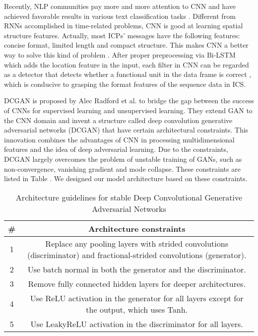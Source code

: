 Recently, NLP communities pay more and more attention to CNN and have achieved favorable results in various text classification tasks \cite{kim2014convolutional,zhang2015character}. Different from RNNs accomplished in time-related problems, CNN is good at learning spatial structure features. Actually, most ICPs’ messages have the following features: concise format, limited length and compact structure. This makes CNN a better way to solve this kind of problem \cite{kim2014convolutional}. After proper preprocessing via Bi-LSTM which adds the location feature in the input, each filter in CNN can be regarded as a detector that detects whether a functional unit in the data frame is correct \cite{adel2016exploring}, which is conducive to grasping the format features of the sequence data in ICS.

DCGAN is proposed by Alec Radford et al. \cite{radford2015unsupervised} to bridge the gap between the success of CNNs for supervised learning and unsupervised learning. They extend GAN to the CNN domain and invent a structure called deep convolution generative adversarial networks (DCGAN) that have certain architectural constraints. This innovation combines the advantages of CNN in processing multidimensional features and the idea of deep adversarial learning. Due to the constraints, DCGAN largely overcomes the problem of unstable training of GANs, such as non-convergence, vanishing gradient and mode collapse. These constraints are listed in Table \uppercase\expandafter{}. We designed our model architecture based on these constraints.


\begin{table}[htbp]
\caption{Architecture guidelines for stable Deep Convolutional Generative Adversarial Networks}
\label{table_example}
\centering
\begin{tabular}{|c|c|}
\hline
\bfseries \# & \bfseries Architecture constraints\\
\hline
1 & \multicolumn{1}{m{7cm}|}{Replace any pooling layers with strided convolutions (discriminator) and fractional-strided convolutions (generator).}\\
\hline
2 & \multicolumn{1}{m{7cm}|}{Use batch normal in both the generator and the discriminator.} \\
\hline
3 & \multicolumn{1}{m{7cm}|}{Remove fully connected hidden layers for deeper architectures.} \\
\hline
4 & \multicolumn{1}{m{7cm}|}{Use ReLU activation in the generator for all layers except for the output, which uses Tanh.}\\
\hline
5 & \multicolumn{1}{m{7cm}|}{Use LeakyReLU activation in the discriminator for all layers.}\\
\hline
\end{tabular}
\end{table}


